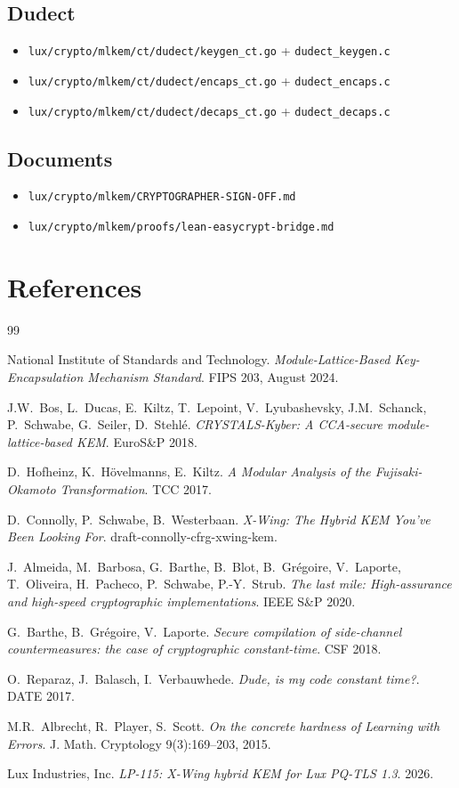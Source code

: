 \documentclass[11pt,a4paper]{article}
\begin{document}
\subsection*{Dudect}
\begin{itemize}
\item \texttt{lux/crypto/mlkem/ct/dudect/keygen\_ct.go} +
  \texttt{dudect\_keygen.c}
\item \texttt{lux/crypto/mlkem/ct/dudect/encaps\_ct.go} +
  \texttt{dudect\_encaps.c}
\item \texttt{lux/crypto/mlkem/ct/dudect/decaps\_ct.go} +
  \texttt{dudect\_decaps.c}
\end{itemize}

\subsection*{Documents}
\begin{itemize}
\item \texttt{lux/crypto/mlkem/CRYPTOGRAPHER-SIGN-OFF.md}
\item \texttt{lux/crypto/mlkem/proofs/lean-easycrypt-bridge.md}
\end{itemize}

\section{References}

\begin{thebibliography}{99}

National Institute of Standards and Technology.
\emph{Module-Lattice-Based Key-Encapsulation Mechanism Standard}.
FIPS 203, August 2024.

J.W.~Bos, L.~Ducas, E.~Kiltz, T.~Lepoint, V.~Lyubashevsky,
J.M.~Schanck, P.~Schwabe, G.~Seiler, D.~Stehl\'e.
\emph{CRYSTALS-Kyber: A CCA-secure module-lattice-based KEM}.
EuroS\&P 2018.

D.~Hofheinz, K.~H\"ovelmanns, E.~Kiltz.
\emph{A Modular Analysis of the Fujisaki-Okamoto Transformation}.
TCC 2017.

D.~Connolly, P.~Schwabe, B.~Westerbaan.
\emph{X-Wing: The Hybrid KEM You've Been Looking For}.
draft-connolly-cfrg-xwing-kem.

J.~Almeida, M.~Barbosa, G.~Barthe, B.~Blot, B.~Gr\'egoire,
V.~Laporte, T.~Oliveira, H.~Pacheco, P.~Schwabe, P.-Y.~Strub.
\emph{The last mile: High-assurance and high-speed cryptographic
implementations}. IEEE S\&P 2020.

G.~Barthe, B.~Gr\'egoire, V.~Laporte.
\emph{Secure compilation of side-channel countermeasures: the case
of cryptographic constant-time}. CSF 2018.

O.~Reparaz, J.~Balasch, I.~Verbauwhede.
\emph{Dude, is my code constant time?}. DATE 2017.

M.R.~Albrecht, R.~Player, S.~Scott.
\emph{On the concrete hardness of Learning with Errors}.
J. Math. Cryptology 9(3):169--203, 2015.

Lux Industries, Inc.
\emph{LP-115: X-Wing hybrid KEM for Lux PQ-TLS 1.3}. 2026.

\end{thebibliography}
\end{document}
